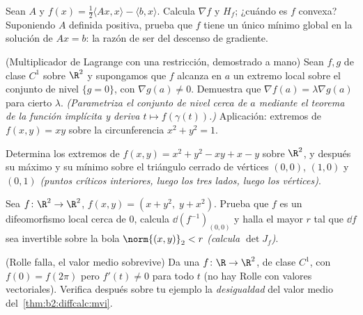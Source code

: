 \begin{exercise}[$\star\star$]\label{exo:b2:diffcalc:5}
Sean $A$  y $f(x) = \frac12\langle Ax, x\rangle - \langle
b, x\rangle$. Calcula $\nabla f$ y $H_f$; ¿cuándo es $f$ convexa?
Suponiendo $A$ definida positiva, prueba que $f$ tiene un único
mínimo global en la solución de $Ax = b$: la razón de ser del
descenso de gradiente.
\end{exercise}

\begin{exercise}[$\star\star$]\label{exo:b2:diffcalc:6}
(Multiplicador de Lagrange con una restricción, demostrado a mano)
Sean $f, g$ de clase $C^1$ sobre $\R^2$ y supongamos que $f$ alcanza
en $a$ un extremo local sobre el conjunto de nivel $\{g = 0\}$, con
$\nabla g(a) \neq 0$. Demuestra que $\nabla f(a) = \lambda\nabla
g(a)$ para cierto $\lambda$. \emph{(Parametriza el conjunto de nivel
cerca de $a$ mediante el teorema de la función implícita y deriva $t
\mapsto f(\gamma(t))$.)} Aplicación: extremos de $f(x,y) = xy$ sobre
la circunferencia $x^2 + y^2 = 1$.
\end{exercise}

\begin{exercise}[$\star\star$]\label{exo:b2:diffcalc:7}
Determina los extremos de $f(x, y) = x^2 + y^2 - xy + x - y$ sobre
$\R^2$, y después su máximo y su mínimo sobre el triángulo cerrado de
vértices $(0,0)$, $(1,0)$ y $(0,1)$ \emph{(puntos críticos
interiores, luego los tres lados, luego los vértices)}.
\end{exercise}

\begin{exercise}[$\star\star\star$]\label{exo:b2:diffcalc:8}
Sea $f \colon \R^2 \to \R^2$, $f(x, y) = (x + y^2,\; y + x^2)$.
Prueba que $f$ es un difeomorfismo local cerca de $0$, calcula
$\dd(f^{-1})_{(0,0)}$ y halla el mayor $r$ tal que $\dd f$ sea
invertible sobre la bola $\norm{(x,y)}_2 < r$ \emph{(calcula $\det
J_f$)}.
\end{exercise}

\begin{exercise}[$\star\star\star$]\label{exo:b2:diffcalc:9}
(Rolle falla, el valor medio sobrevive) Da una $f \colon \R \to
\R^2$, de clase $C^1$, con $f(0) = f(2\pi)$ pero $f'(t) \neq 0$ para
todo $t$ (no hay Rolle con valores vectoriales). Verifica después
sobre tu ejemplo la \emph{desigualdad} del valor medio del~\cref{thm:b2:diffcalc:mvi}.
\end{exercise}

